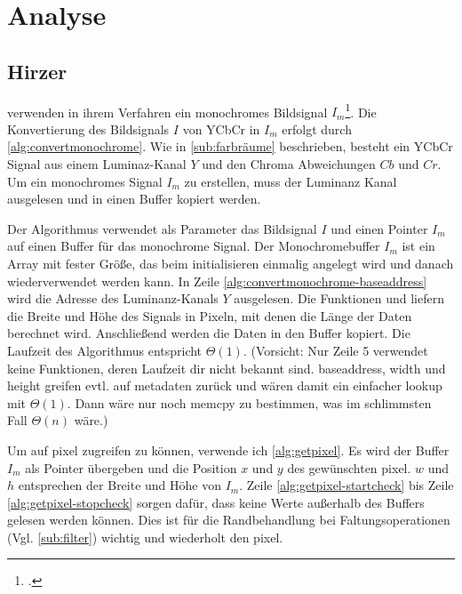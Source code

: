 \section{Analyse} %
\label{sec:analyse}
\begin{comment}
	Detailierte Beschreibung der Algorithmen inkl. O-Notation (Nitty-Gritty Darstellung der Algos)
	1. ARToolKitPlus
	2. Zissermann/Clarke
	Analyse: Die auswertung nach den Kriterein aus Kap. Vorgehen OHNE WERTUNG! Nur die Daten erheben und auswerten.
\end{comment}

\subsection{Hirzer} %
\label{sub:hirzer}

\citeauthor{clarke96} verwenden in ihrem Verfahren ein monochromes Bildsignal $I_m$\footcite[Vgl.][S.~417]{clarke96}.
 Die Konvertierung des Bildsignals $I$ von YCbCr in $I_m$ erfolgt durch \autoref{alg:convertmonochrome}. Wie in
 \autoref{sub:farbräume} beschrieben, besteht ein YCbCr Signal aus einem Luminaz-Kanal $Y$ und den Chroma Abweichungen
 $Cb$ und $Cr$. Um ein monochromes Signal $I_m$ zu erstellen, muss der Luminanz Kanal ausgelesen und in einen Buffer
 kopiert werden.



Der Algorithmus verwendet als Parameter das Bildsignal $I$ und einen Pointer $I_m$ auf einen Buffer für das monochrome
 Signal. Der Monochromebuffer $I_m$ ist ein Array mit fester Größe, das beim initialisieren einmalig angelegt wird und
 danach wiederverwendet werden kann. In Zeile \ref{alg:convertmonochrome-baseaddress} wird die Adresse des
 Luminanz-Kanals $Y$ ausgelesen. Die Funktionen  und  liefern die Breite und Höhe des
 Signals in Pixeln, mit denen die Länge der Daten berechnet wird. Anschließend werden die Daten in den Buffer kopiert.
 Die Laufzeit des Algorithmus entspricht $\Theta(1)$. (Vorsicht: Nur Zeile 5 verwendet keine Funktionen, deren Laufzeit
 dir nicht bekannt sind. baseaddress, width und height greifen evtl. auf metadaten zurück und wären damit ein einfacher
 lookup mit $\Theta(1)$. Dann wäre nur noch memcpy zu bestimmen, was im schlimmsten Fall $\Theta(n)$ wäre.)

Um auf \gls{pixel} zugreifen zu können, verwende ich \autoref{alg:getpixel}. Es wird der Buffer $I_m$ als Pointer
 übergeben und die Position $x$ und $y$ des gewünschten \gls{pixel}. $w$ und $h$ entsprechen der Breite und Höhe von
 $I_m$. Zeile \ref{alg:getpixel-startcheck} bis Zeile \ref{alg:getpixel-stopcheck} sorgen dafür, dass keine Werte
 außerhalb des Buffers gelesen werden können. Dies ist für die Randbehandlung bei Faltungsoperationen
 (Vgl. \autoref{sub:filter}) wichtig und wiederholt den \gls{pixel}.


